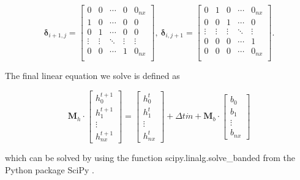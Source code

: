 \documentclass[journal abbreviation, manuscript]{copernicus}
\begin{document}
\begin{equation*}
    \boldsymbol{\delta}_{i+1, j} = 
    \begin{bmatrix}
        0 & 0  & \cdots & 0 &  0_{nx} \\
        1 & 0  & \cdots & 0 & 0 \\
        0 & 1  & \cdots & 0 & 0 \\
        \vdots & \vdots & \ddots & \vdots & \vdots \\
        0 & 0  & \cdots & 1 & 0_{nx} \\
    \end{bmatrix},~
    \boldsymbol{\delta}_{i, j + 1} = 
    \begin{bmatrix}
        0 & 1 & 0 & \cdots &  0_{nx} \\
        0 & 0 & 1 & \cdots & 0 \\
        \vdots & \vdots & \vdots & \ddots & \vdots \\
        0 & 0 & 0 & \cdots & 1 \\
        0 & 0 & 0 & \cdots & 0_{nx} \\
    \end{bmatrix}.
\end{equation*}

\noindent The final linear equation we solve is defined as

\begin{equation}\label{eqn:final_implicit_equation}
    \boldsymbol{M}_h \cdot
    \begin{bmatrix}
        h_{0}^{t+1} \\
        h_{1}^{t+1} \\
        \vdots \\
        h_{nx}^{t+1}
    \end{bmatrix}
    =
    \begin{bmatrix}
        h_{0}^{t} \\
        h_{1}^{t} \\
        \vdots \\
        h_{nx}^{t}
    \end{bmatrix}
    + \Delta t \Dot{m} + \boldsymbol{M}_b \cdot
    \begin{bmatrix}
        b_{0} \\
        b_{1} \\
        \vdots \\
        b_{nx}
    \end{bmatrix}
\end{equation}

\noindent which can be solved by using the function \textsf{scipy.linalg.solve\_banded} from the Python package \textsf{SciPy} \citep{2020SciPy-NMeth}.
\end{document}
